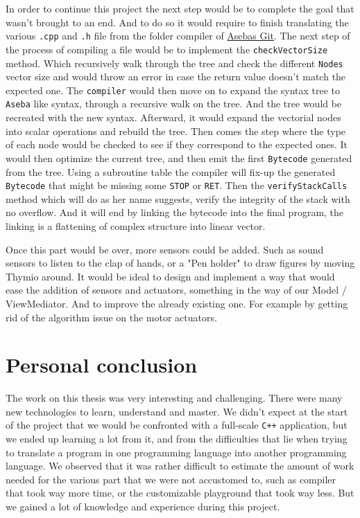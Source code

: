 \documentclass{scrbook}
\begin{document}
In order to continue this project the next step would be to complete the goal that wasn’t brought to an end. And to do so it would require to finish translating the various \texttt{.cpp} and \texttt{.h} file from the folder compiler of \href{ https://github.com/aseba-community/aseba/tree/master/aseba/compiler}{Asebas Git}. 
The next step of the process of compiling a file would be to implement the \texttt{checkVectorSize} method. Which recursively walk through the tree and check the different \texttt{Nodes} vector size and would throw an error in case the return value doesn’t match the expected one. 
The \texttt{compiler} would then move on to expand the syntax tree to \texttt{Aseba} like syntax, through a recursive walk on the tree. And the tree would be recreated with the new syntax. Afterward, it would expand the vectorial nodes into scalar operations and rebuild the tree. 
Then comes the step where the type of each node would be checked to see if they correspond to the expected ones. It would then optimize the current tree, and then emit the first \texttt{Bytecode} generated from the tree. 
Using a subroutine table the compiler will fix-up the generated \texttt{Bytecode} that might be missing some \texttt{STOP} or \texttt{RET}. Then the \texttt{verifyStackCalls} method which will do as her name suggests, verify the integrity of the stack with no overflow. 
And it will end by linking the bytecode into the final program, the linking is a flattening of complex structure into linear vector.

Once this part would be over, more sensors could be added. Such as sound sensors to listen to the clap of hands, or a "Pen holder" to draw figures by moving Thymio around. 
It would be ideal to design and implement a way that would ease the addition of sensors and actuators, something in the way of our Model / ViewMediator. And to improve the already existing one. For example by getting rid of the algorithm issue on the motor actuators.

\section{Personal conclusion}

The work on this thesis was very interesting and challenging. There were many new technologies to learn, understand and master. We didn’t expect at the start of the project that we would be confronted with a full-scale \texttt{C++} application, but we ended up learning a lot from it, 
and from the difficulties that lie when trying to translate a program in one programming language into another programming language. We observed that it was rather difficult to estimate the amount of work needed for the various part that we were not accustomed to, 
such as compiler that took way more time, or the customizable playground that took way less. But we gained a lot of knowledge and experience during this project.
\end{document}
